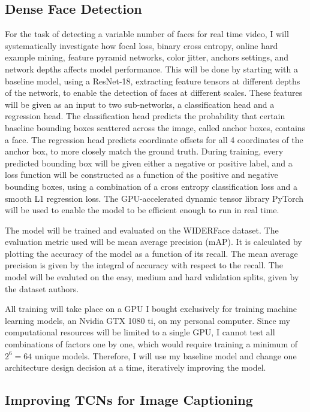 \documentclass[a4paper, twoside]{article}
\begin{document}
\subsection{Dense Face Detection}
For the task of detecting a variable number of faces for real time video, I will systematically investigate how focal loss, binary cross entropy, online hard example mining, feature pyramid networks, color jitter, anchors settings, and network depths affects model performance. This will be done by starting with a baseline model, using a ResNet-18, extracting feature tensors at different depths of the network, to enable the detection of faces at different scales. These features will be given as an input to two sub-networks, a classification head and a regression head. The classification head predicts the probability that certain baseline bounding boxes scattered across the image, called anchor boxes, contains a face. The regression head predicts coordinate offsets for all 4 coordinates of the anchor box, to more closely match the ground truth. During training, every predicted bounding box will be given either a negative or positive label, and a loss function will be constructed as a function of the positive and negative bounding boxes, using a combination of a cross entropy classification loss and a smooth L1 regression loss. The GPU-accelerated dynamic tensor library PyTorch will be used to enable the model to be efficient enough to run in real time.

The model will be trained and evaluated on the WIDERFace dataset. The evaluation metric used will be mean average precision (mAP). It is calculated by plotting the accuracy of the model as a function of its recall. The mean average precision is given by the integral of accuracy with respect to the recall. The model will be evaluted on the easy, medium and hard validation splits, given by the dataset authors.

All training will take place on a GPU I bought exclusively for training machine learning models, an Nvidia GTX 1080 ti, on my personal computer. Since my computational resources will be limited to a single GPU, I cannot test all combinations of factors one by one, which would require training a minimum of $2^6=64$ unique models. Therefore, I will use my baseline model and change one architecture design decision at a time, iteratively improving the model.

\subsection{Improving TCNs for Image Captioning}
\end{document}
